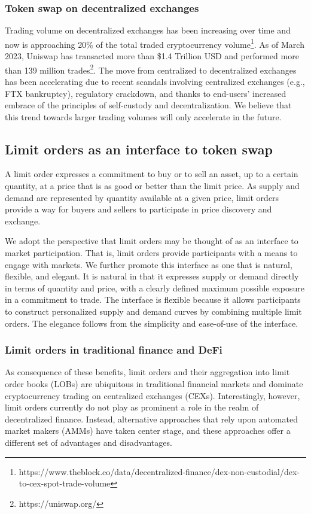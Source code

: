 \documentclass[11pt, reqno]{amsart}
\theoremstyle{definition}
\theoremstyle{remark}
\begin{document}

\subsubsection{Token swap on decentralized exchanges}
Trading volume on decentralized exchanges has been increasing over time and now
is approaching 20\% of the total traded cryptocurrency
volume\footnote{https://www.theblock.co/data/decentralized-finance/dex-non-custodial/dex-to-cex-spot-trade-volume}.
As of March 2023, Uniswap has transacted more than \$1.4 Trillion USD and
performed more than 139 million trades\footnote{https://uniswap.org/}.
The move from centralized to decentralized exchanges has been accelerating due
to recent scandals involving centralized exchanges (e.g., FTX bankruptcy),
regulatory crackdown, and thanks to end-users' increased embrace of the
principles of self-custody and decentralization.
We believe that this trend towards larger trading volumes will only accelerate
in the future.

\subsection{Limit orders as an interface to token swap}
A limit order expresses a commitment to buy or to sell an asset, up to
a certain quantity, at a price that is as good or better than the limit price.
As supply and demand are represented by quantity available at a given price,
limit orders provide a way for buyers and sellers to participate in price
discovery and exchange.

We adopt the perspective that limit orders may be thought of as an interface
to market participation. That is, limit orders provide participants with a
means to engage with markets. We further promote this interface as one that
is natural, flexible, and elegant. It is natural in that it expresses
supply or demand directly in terms of quantity and price, with a clearly
defined maximum possible exposure in a commitment to trade. The interface is
flexible because it allows participants to construct personalized supply and
demand curves by combining multiple limit orders. The elegance follows from the
simplicity and ease-of-use of the interface.

\subsubsection{Limit orders in traditional finance and DeFi}
As consequence of these benefits, limit orders and their aggregation into
limit order books (LOBs) are ubiquitous in traditional financial markets
and dominate cryptocurrency trading on centralized exchanges (CEXs).
Interestingly, however, limit orders currently do not play as prominent a role
in the realm of decentralized finance. Instead, alternative approaches that
rely upon automated market makers (AMMs) have taken center stage, and these
approaches offer a different set of advantages and disadvantages.
\end{document}
